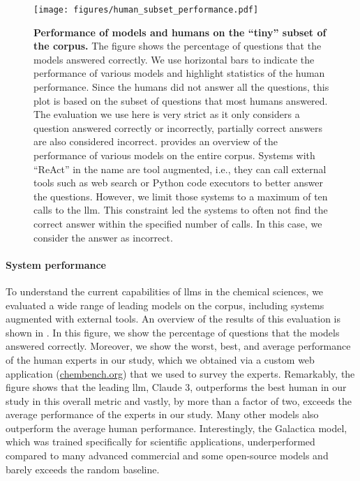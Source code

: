 \documentclass[11pt, oneside]{article}
\begin{document}
\begin{refsection}
\begin{figure}[!h]
    \centering
    \texttt{[image: figures/human\_subset\_performance.pdf]}
    \caption{\textbf{Performance of models and humans on the \enquote{tiny} subset of the  \chembench corpus.} The figure shows the percentage of questions that the models answered correctly. We use horizontal bars to indicate the performance of various models and highlight statistics of the human performance. 
    Since the humans did not answer all the questions, this plot is based on the subset of questions that most humans answered.
    The evaluation we use here is very strict as it only considers a question answered correctly or incorrectly, partially correct answers are also considered incorrect.
     provides an overview of the performance of various models on the entire corpus.
    Systems with \enquote{ReAct} in the name are tool augmented, i.e., they can call external tools such as web search or Python code executors to better answer the questions.
    However, we limit those systems to a maximum of ten calls to the \gls{llm}. This constraint led the systems to often not find the correct answer within the specified number of calls.
    In this case, we consider the answer as incorrect. 
    }
    \label{fig:human_vs_models_bar}
\end{figure}

\paragraph{System performance} 
To understand the current capabilities of \glspl{llm} in the chemical sciences, we evaluated a wide range of leading models\autocite{Huggingface} on the \chembench corpus, including systems augmented with external tools.
An overview of the results of this evaluation is shown in . 
In this figure, we show the percentage of questions that the models answered correctly.
Moreover, we show the worst, best, and average performance of the human experts in our study, which we obtained via a custom web application (\url{chembench.org}) that we used to survey the experts.
Remarkably, the figure shows that the leading \gls{llm}, Claude 3, outperforms the best human in our study in this overall metric and vastly, by more than a factor of two, exceeds the average performance of the experts in our study.
Many other models also outperform the average human performance. 
Interestingly, the Galactica model, which was trained specifically for scientific applications, underperformed compared to many advanced commercial and some open-source models and barely exceeds the random baseline.


\end{refsection}
\end{document}
